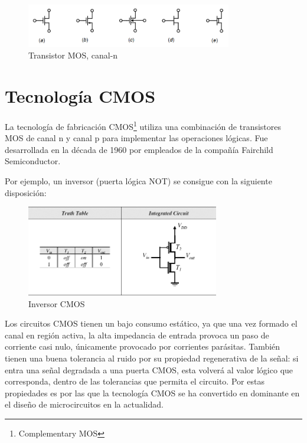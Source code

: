 \documentclass[12pt]{report} %
\begin{document}
	
	\begin{figure}[H]
		\includegraphics[width=0.8\textwidth]{n-mos-symbol.png}
		\caption[Transistor MOS, canal-n]{Transistor MOS, canal-n\protect\footnotemark}
		\label{fig:n-mos-symbol.png}
	\end{figure}
	
	
	
	\section{Tecnología CMOS}
	
	La tecnología de fabricación CMOS\footnote{Complementary MOS} utiliza una combinación de transistores MOS de canal n y canal p para implementar las operaciones lógicas. Fue desarrollada en la década de 1960 por empleados de la compañía Fairchild Semiconductor\cite{cmos-fairchild}.
	
	Por ejemplo, un inversor (puerta lógica NOT) se consigue con la siguiente disposición:
	
	\begin{figure}[H]
		\includegraphics[width=0.75\textwidth]{inverter_mos.jpg}
		\caption[Inversor CMOS]{Inversor CMOS\protect\footnotemark}
		\label{fig:inverter_mos.jpg}
	\end{figure}
	
	
	Los circuitos CMOS tienen un bajo consumo estático, ya que una vez formado el canal en región activa, la alta impedancia de entrada provoca un paso de corriente casi nulo, únicamente provocado por corrientes parásitas. También tienen una buena tolerancia al ruido por su propiedad regenerativa de la señal: si entra una señal degradada a una puerta CMOS, esta volverá al valor lógico que corresponda, dentro de las tolerancias que permita el circuito. Por estas propiedades es por las que la tecnología CMOS se ha convertido en dominante en el diseño de microcircuitos en la actualidad.
	
\end{document}
